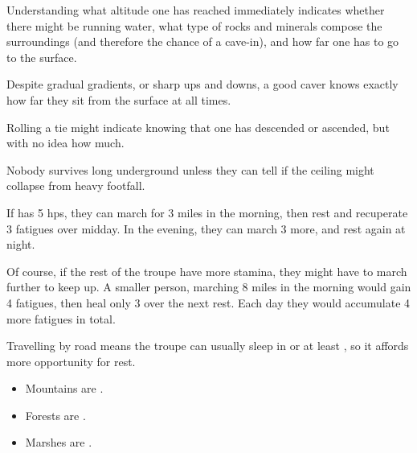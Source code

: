 \begin{multicols}{2}

Understanding what altitude one has reached immediately indicates whether there might be running water, what type of rocks and minerals compose the surroundings (and therefore the chance of a cave-in), and how far one has to go to the surface.

Despite gradual gradients, or sharp ups and downs, a good caver knows exactly how far they sit from the surface at all times.

Rolling a tie might indicate knowing that one has descended or ascended, but with no idea how much.

Nobody survives long underground unless they can tell if the ceiling might collapse from heavy footfall.



If  has 5 \glspl{hp}, they can march for 3 miles in the morning, then rest and recuperate 3 \glspl{fatigue} over midday.
In the evening, they can march 3 more, and rest again at night.

Of course, if the rest of the troupe have more stamina, they might have to march further to keep up.
A smaller person, marching 8 miles in the morning would gain 4 \glspl{fatigue}, then heal only 3 over the next rest.
Each day they would accumulate 4 more \glspl{fatigue} in total.

Travelling by road means the troupe can usually sleep in  or at least , so it affords more opportunity for rest.


\begin{itemize}

  \item
    Mountains are \tn[8].
  \item
    Forests are \tn[11].
  \item
    Marshes are \tn[12].


\end{itemize}
\end{multicols}
